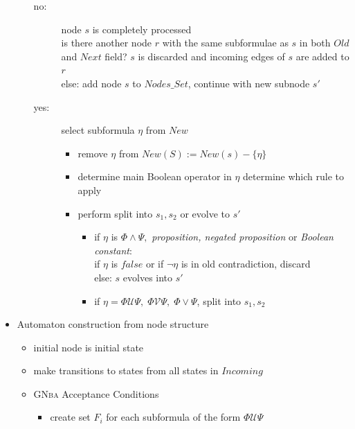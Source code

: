 \documentclass[a4paper, 10pt]{article}
\begin{document}
\begin{itemize}
\begin{itemize}
\begin{description}
            \item[no:] node $s$ is completely processed\\
            is there another node $r$ with the same subformulae as $s$ in both $Old$ and $Next$ field? \follows $s$ is discarded and incoming edges of $s$ are added to $r$\\
            else: add node $s$ to $Nodes\_Set$, continue with new subnode $s'$
            \begin{center}
            \scalebox{1}{}
            \end{center}
            \item[yes:] select subformula $\eta$ from $New$
            \begin{itemize}
                \item remove $\eta$ from $New(S):=New(s)-\{\eta\}$
                \item determine main Boolean operator in $\eta$ \follows determine which rule to apply
                \item perform split into $s_1,s_2$ or evolve to $s'$
                \begin{itemize}
                    \item if $\eta$ is $\Phi\wedge\Psi,$ \emph{proposition, negated proposition} or \emph{Boolean constant}:
                    \\ if $\eta$ is $false$ or if $\neg\eta$ is in old \follows contradiction, discard
                    \\ else: $s$ evolves into $s'$
                    \item if $\eta=\Phi \mathcal{U}\Psi,\; \Phi \mathcal{V}\Psi,\; \Phi\vee\Psi$, split into $s_1,s_2$
                \end{itemize}
            \end{itemize}
        \end{description}
    \end{itemize}
    \item Automaton construction from node structure
    \begin{itemize}
        \item initial node is initial state
        \item make transitions to states from all states in $Incoming$
        \item \textsc{GNba} Acceptance Conditions
        \begin{itemize}
            \item create set $F_i$ for each subformula of the form $\Phi \mathcal{U}\Psi$

\end{itemize}
\end{itemize}
\end{itemize}
\end{document}
